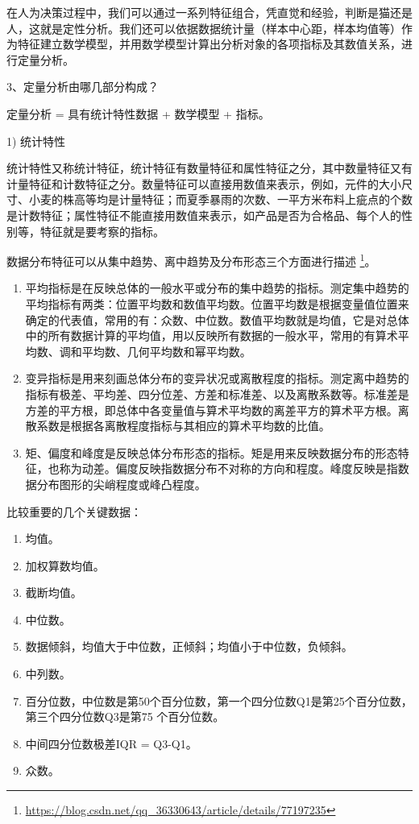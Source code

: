 在人为决策过程中，我们可以通过一系列特征组合，凭直觉和经验，判断是猫还是人，这就是定性分析。我们还可以依据数据统计量（样本中心距，样本均值等）作为特征建立数学模型，并用数学模型计算出分析对象的各项指标及其数值关系，进行定量分析。

3、定量分析由哪几部分构成？

定量分析 = 具有统计特性数据 + 数学模型 + 指标。

1) 统计特性

统计特性又称统计特征，统计特征有数量特征和属性特征之分，其中数量特征又有计量特征和计数特征之分。数量特征可以直接用数值来表示，例如，元件的大小尺寸、小麦的株高等均是计量特征；而夏季暴雨的次数、一平方米布料上疵点的个数是计数特征；属性特征不能直接用数值来表示，如产品是否为合格品、每个人的性别等，特征就是要考察的指标。

数据分布特征可以从集中趋势、离中趋势及分布形态三个方面进行描述 \footnote{\url{https://blog.csdn.net/qq_36330643/article/details/77197235}}。

\begin{enumerate}[label=\circled{\arabic*}]
    \item 平均指标是在反映总体的一般水平或分布的集中趋势的指标。测定集中趋势的平均指标有两类：位置平均数和数值平均数。位置平均数是根据变量值位置来确定的代表值，常用的有：众数、中位数。数值平均数就是均值，它是对总体中的所有数据计算的平均值，用以反映所有数据的一般水平，常用的有算术平均数、调和平均数、几何平均数和幂平均数。
    \item 变异指标是用来刻画总体分布的变异状况或离散程度的指标。测定离中趋势的指标有极差、平均差、四分位差、方差和标准差、以及离散系数等。标准差是方差的平方根，即总体中各变量值与算术平均数的离差平方的算术平方根。离散系数是根据各离散程度指标与其相应的算术平均数的比值。
    \item 矩、偏度和峰度是反映总体分布形态的指标。矩是用来反映数据分布的形态特征，也称为动差。偏度反映指数据分布不对称的方向和程度。峰度反映是指数据分布图形的尖峭程度或峰凸程度。
\end{enumerate}

比较重要的几个关键数据：
\begin{enumerate}[label=\circled{\arabic*}]
    \item 均值。
    \item 加权算数均值。
    \item 截断均值。
    \item 中位数。
    \item 数据倾斜，均值大于中位数，正倾斜；均值小于中位数，负倾斜。
    \item 中列数。
    \item 百分位数，中位数是第50个百分位数，第一个四分位数Q1是第25个百分位数，第三个四分位数Q3是第75 个百分位数。
    \item 中间四分位数极差IQR = Q3-Q1。
    \item 众数。
\end{enumerate}

